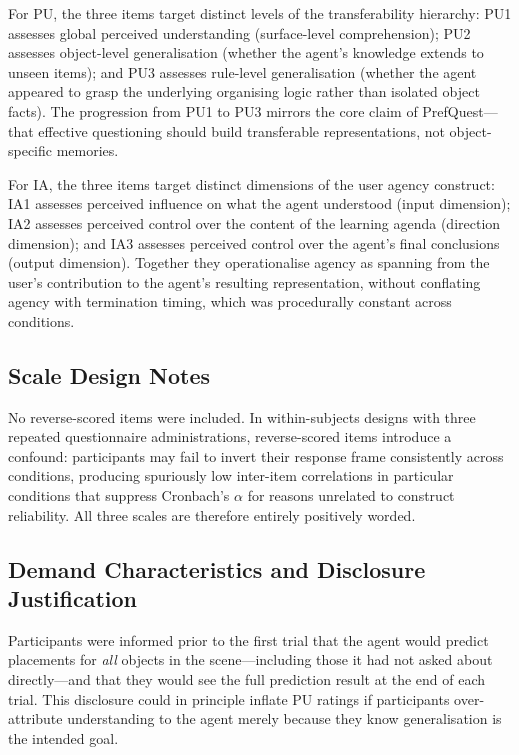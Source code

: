 \documentclass[manuscript,review,anonymous]{acmart}
\begin{document}
For PU, the three items target distinct levels of the transferability hierarchy: PU1 assesses global perceived understanding (surface-level comprehension); PU2 assesses object-level generalisation (whether the agent's knowledge extends to unseen items); and PU3 assesses rule-level generalisation (whether the agent appeared to grasp the underlying organising logic rather than isolated object facts). The progression from PU1 to PU3 mirrors the core claim of PrefQuest---that effective questioning should build transferable representations, not object-specific memories.

For IA, the three items target distinct dimensions of the user agency construct: IA1 assesses perceived influence on what the agent understood (input dimension); IA2 assesses perceived control over the content of the learning agenda (direction dimension); and IA3 assesses perceived control over the agent's final conclusions (output dimension). Together they operationalise agency as spanning from the user's contribution to the agent's resulting representation, without conflating agency with termination timing, which was procedurally constant across conditions.

\subsection*{Scale Design Notes}

No reverse-scored items were included. In within-subjects designs with three repeated questionnaire administrations, reverse-scored items introduce a confound: participants may fail to invert their response frame consistently across conditions, producing spuriously low inter-item correlations in particular conditions that suppress Cronbach's $\alpha$ for reasons unrelated to construct reliability. All three scales are therefore entirely positively worded.

\subsection*{Demand Characteristics and Disclosure Justification}

Participants were informed prior to the first trial that the agent would predict placements for \textit{all} objects in the scene---including those it had not asked about directly---and that they would see the full prediction result at the end of each trial. This disclosure could in principle inflate PU ratings if participants over-attribute understanding to the agent merely because they know generalisation is the intended goal.
\end{document}
